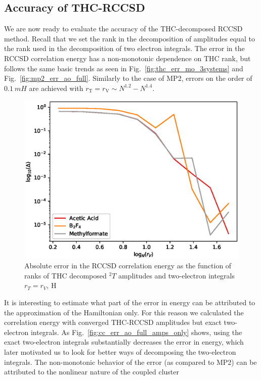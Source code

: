 \subsection{Accuracy of THC-RCCSD}
We are now ready to evaluate the accuracy of the THC-decomposed RCCSD
method. Recall that we set the rank in the decomposition of amplitudes 
equal to the rank used in the decomposition of two electron integrals. The 
error in the RCCSD correlation energy has a non-monotonic dependence on THC 
rank, but follows the 
same basic trends as seen in Fig.~\ref{fig:thc_err_mo_3systems} and
Fig.~\ref{fig:mp2_err_ao_full}. Similarly to the case of MP2, errors on 
the order of $0.1~mH$ are achieved with $r_\mathrm{T} = r_\mathrm{V} \sim 
N^{1.2} - N^{1.4}$.
%
\begin{figure}[tb]
\includegraphics[width=\columnwidth]{figures/thc_rccsd/cc_err_ao_full}
\caption{Absolute error in the RCCSD correlation energy as the function of 
ranks of THC decomposed ${}^2T$ amplitudes and two-electron integrals 
$r_{T} = r_{V}$, H
\label{fig:cc_err_ao_full}}
\end{figure}
%
It is interesting to estimate what part of the error in energy can be
attributed to the approximation of the Hamiltonian only. For this reason we 
calculated the correlation energy with converged THC-RCCSD amplitudes but exact
two-electron integrals.  As Fig.~\ref{fig:cc_err_ao_full_amps_only}
shows, using the exact two-electron integrals substantially decreases the error 
in energy, which later motivated us to look for better ways of decomposing the 
two-electron integrals. The non-monotonic behavior of the error (as compared to 
MP2) can be attributed to the nonlinear nature of the coupled cluster 
